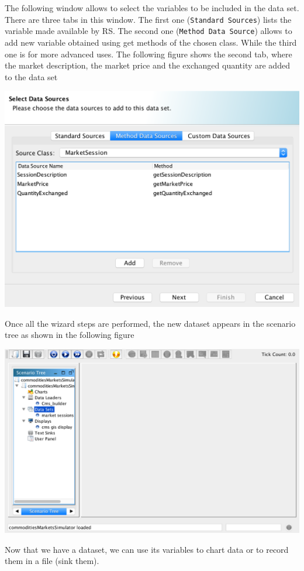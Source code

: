 \documentclass{article}
\begin{document}
The following window allows to select the variables to be included in the data set. There are three tabs in this window. The first one (\verb+Standard Sources+) lists the variable made available by RS. The second one (\verb+Method Data Source+) allows to add new variable obtained using get methods of the chosen class. While the third one is for more advanced uses. The following figure shows the second tab, where the market description, the market price and the exchanged quantity are added to the data set 

\includegraphics[scale=0.35]{fig_cms_rs_data3}

Once all the wizard steps are performed, the new dataset appears in the scenario tree as shown in the following figure

\includegraphics[scale=0.35]{fig_cms_rs_data4}

Now that we have a dataset, we can use its variables to chart data or to record them in a file (sink them). 
\end{document}

